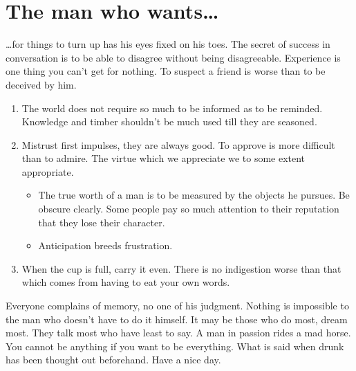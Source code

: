 \section{The man who wants\ldots}
\ldots for things to turn up has his eyes fixed on his toes.  The
secret of success in conversation is to be able to disagree without
being disagreeable.  Experience is one thing you can't get for
nothing.  To suspect a friend is worse than to be deceived by him.
\begin{enumerate}
\item The world does not require so much to be informed as to be
  reminded. Knowledge and timber shouldn't be much used till they are
  seasoned.
\item Mistrust first impulses, they are always good.  To approve is
  more difficult than to admire.  The virtue which we appreciate we to
  some extent appropriate.
\begin{itemize}
\item The true worth of a man is to be measured by the objects he pursues.
Be obscure clearly.  Some people pay so much attention to their
reputation that they lose their character.  
\item Anticipation breeds frustration.
\end{itemize}
\item When the cup is full, carry it even.
There is no indigestion
worse than that which comes from having to eat your own words.
\end{enumerate}


Everyone complains of memory, no one of his judgment.  Nothing is
impossible to the man who doesn't have to do it himself.  It may be
those who do most, dream most.  They talk most who have least to say.
A man in passion rides a mad horse.  You cannot be anything if you
want to be everything.  What is said when drunk has been thought out
beforehand.  Have a nice day.
